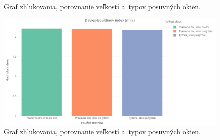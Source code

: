 \documentclass[a4paper,twoside,slovak,12pt,appendix]{article}
\begin{document}
\begin{appendices}
\begin{figure}[htbp]
  \caption{Graf zhlukovania, porovnanie veľkostí a~typov posuvných okien.}
\end{figure}
\begin{figure}[htbp]
  \centering
  \includegraphics[width=\textwidth]{cvi/window_comparison/201903072017-DB-window_comparison.png}
  \caption{Graf zhlukovania, porovnanie veľkostí a~typov posuvných okien.}
\end{figure}


\end{appendices}
\end{document}
